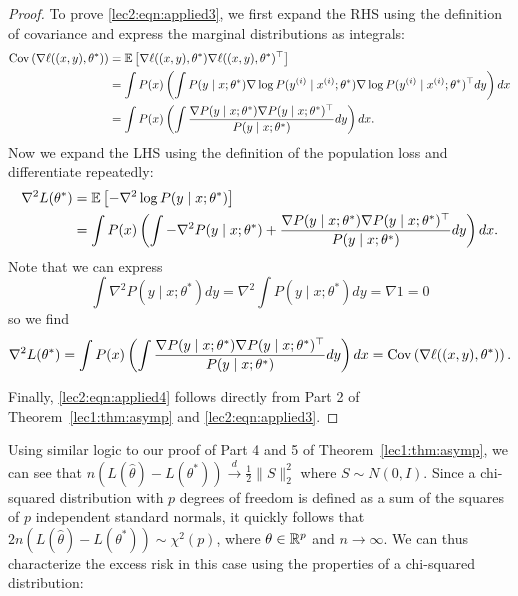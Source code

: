 \begin{proof}
To prove \eqref{lec2:eqn:applied3}, we first expand the RHS using the definition of covariance and express the marginal distributions as integrals:
\begin{align}
    \operatorname{Cov} \left( \nabla \ell ((x, y), \theta^*) \right) &= \operatorname*{\mathbb{E}} \left[ \nabla \ell ((x, y), \theta^*) \nabla \ell ((x, y), \theta^*)^\top \right] \\
    &= \int P(x) \left( \int P(y \mid x; \theta^*) \nabla \log P( y^{(i)} \mid x^{(i)} ; \theta^*) \nabla \log P( y^{(i)} \mid x^{(i)} ; \theta^*)^\top dy \right) dx \\
    &= \int P(x) \left( \int \frac{\nabla P(y \mid x; \theta^*) \nabla P(y \mid x; \theta^*)^\top}{P(y \mid x; \theta^*)}dy \right) dx.
\end{align}
Now we expand the LHS using the definition of the population loss and differentiate repeatedly:
\begin{align}
    \nabla^2 L(\theta^*) &= \operatorname*{\mathbb{E}} \left[- \nabla^2 \log P(y \mid x; \theta^*) \right] \\
    &= \int P(x) \left( \int - \nabla^2 P(y \mid x; \theta^*) + \frac{\nabla P(y \mid x; \theta^*) \nabla P(y \mid x; \theta^*)^\top}{P(y \mid x; \theta^*)}dy  \right) dx.
\end{align}
Note that we can express 
\begin{equation} \int \nabla^2 P(y \mid x; \theta^*) dy = \nabla^2 \int P(y \mid x; \theta^*) dy = \nabla 1  = 0 \end{equation}
so we find
\begin{equation} \nabla^2 L(\theta^*) = \int P(x) \left( \int \frac{\nabla P(y \mid x; \theta^*) \nabla P(y \mid x; \theta^*)^\top}{P(y \mid x; \theta^*)}dy \right) dx = \operatorname{Cov} \left( \nabla \ell ((x, y), \theta^*) \right). \end{equation}

Finally, \eqref{lec2:eqn:applied4} follows directly from Part 2 of Theorem~\ref{lec1:thm:asymp} and \eqref{lec2:eqn:applied3}.
\end{proof}

Using similar logic to our proof of Part 4 and 5 of Theorem~\ref{lec1:thm:asymp}, we can see that $n (L(\hat \theta) - L(\theta^*)) \overset d \to \frac12 \|S\|_2^2$ where $S \sim N(0, I)$. Since a chi-squared distribution with $p$ degrees of freedom is defined as a sum of the squares of $p$ independent standard normals, it quickly follows that $2n (L(\hat \theta) - L(\theta^*)) \sim  \chi^2(p)$, where $\theta \in \mathbb R^p$ and $n \to \infty$. We can thus characterize the excess risk in this case using the properties of a chi-squared distribution:

